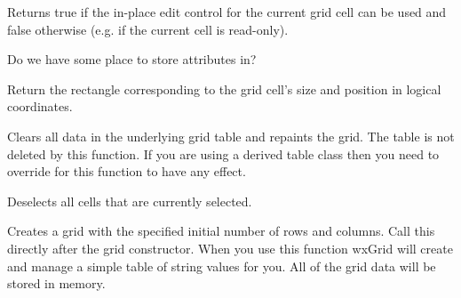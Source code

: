 \label{wxgridcanenablecellcontrol}


Returns true if the in-place edit control for the current grid cell can be used and
false otherwise (e.g. if the current cell is read-only).



\label{wxgridcanhaveattributes}


Do we have some place to store attributes in?



\label{wxgridcelltorect}



Return the rectangle corresponding to the grid cell's size and position in logical
coordinates.



\label{wxgridcleargrid}


Clears all data in the underlying grid table and repaints the grid. The table is not deleted by
this function. If you are using a derived table class then you need to override
 for this function to have any effect.



\label{wxgridclearselection}


Deselects all cells that are currently selected.



\label{wxgridcreategrid}


Creates a grid with the specified initial number of rows and columns.
Call this directly after the grid constructor. When you use this
function wxGrid will create and manage a simple table of string values
for you. All of the grid data will be stored in memory.

